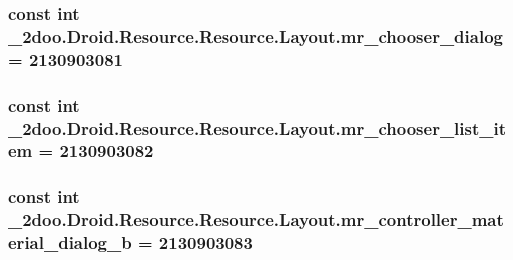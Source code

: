 \hypertarget{class__2doo_1_1_droid_1_1_resource_1_1_layout_33e11b793691a2fe574d79e677eee026}{
\subsubsection[{mr\_\-chooser\_\-dialog}]{\setlength{\rightskip}{0pt plus 5cm}const int \_\-2doo.Droid.Resource.Resource.Layout.mr\_\-chooser\_\-dialog = 2130903081}}
\label{class__2doo_1_1_droid_1_1_resource_1_1_layout_33e11b793691a2fe574d79e677eee026}


\hypertarget{class__2doo_1_1_droid_1_1_resource_1_1_layout_c55079ff345e2478140f7b3b98430310}{
\subsubsection[{mr\_\-chooser\_\-list\_\-item}]{\setlength{\rightskip}{0pt plus 5cm}const int \_\-2doo.Droid.Resource.Resource.Layout.mr\_\-chooser\_\-list\_\-item = 2130903082}}
\label{class__2doo_1_1_droid_1_1_resource_1_1_layout_c55079ff345e2478140f7b3b98430310}


\hypertarget{class__2doo_1_1_droid_1_1_resource_1_1_layout_ec9561fe94c70cb50e47429e3fc7a1d5}{
\subsubsection[{mr\_\-controller\_\-material\_\-dialog\_\-b}]{\setlength{\rightskip}{0pt plus 5cm}const int \_\-2doo.Droid.Resource.Resource.Layout.mr\_\-controller\_\-material\_\-dialog\_\-b = 2130903083}}
\label{class__2doo_1_1_droid_1_1_resource_1_1_layout_ec9561fe94c70cb50e47429e3fc7a1d5}


